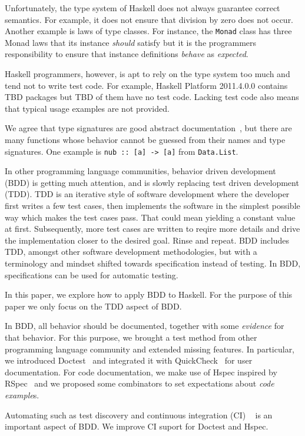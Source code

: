 \documentclass[preprint]{sigplanconf}
\begin{document}
Unfortunately, the type system of Haskell does not always guarantee
correct semantics.
For example, it does not ensure that division by zero does not occur.
Another example is laws of type classes. 
For instance, the {\tt Monad} class has three Monad laws 
that its instance \emph{should} satisfy
but
it is the programmers responsibility to ensure that
instance definitions \emph{behave} as \emph{expected}.

Haskell programmers, however, is apt to rely on the type system too much
and tend not to write test code.
For example, Haskell Platform 2011.4.0.0 contains
TBD packages but TBD of them have no test code.
Lacking test code also means that typical usage examples are not provided.

We agree that type signatures are good abstract documentation~\cite{free}, but
there are many functions whose behavior cannot be guessed from their names and
type signatures.  One example is \verb|nub :: [a] -> [a]| from {\tt Data.List}.

In other programming language communities, behavior driven development
(BDD) is getting much attention, and is slowly replacing test driven
development (TDD).  TDD is an iterative style of software development
where the developer first writes a few test cases, then implements the
software in the simplest possible way which makes the test cases pass.
That could mean yielding a constant value at first.  Subsequently,
more test cases are written to reqire more details and drive the
implementation closer to the desired goal.  Rinse and repeat.  BDD
includes TDD, amongst other software development methodologies, but
with a terminology and mindset  shifted towards specification instead
of testing.  In BDD, specifications can be used for automatic testing.

In this paper, we explore how to apply BDD to Haskell.
For the purpose of this paper we only focus on the TDD aspect of BDD.

In BDD, all behavior should be documented, together with some
\emph{evidence} for that behavior.
For this purpose, 
we brought a test method from other programming language community and
extended missing features.
In particular, we introduced Doctest~\cite{doctest} and
integrated it with QuickCheck~\cite{quickcheck}
for user documentation.
For code documentation,
we make use of Hspec inspired by RSpec~\cite{rspec}
and we proposed some combinators to set expectations
about \emph{code example}\/s.

Automating such as test discovery and continuous integration (CI) ~\cite{ci} 
is an important aspect of BDD.
We improve CI suport for Doctest and Hspec.
\end{document}
